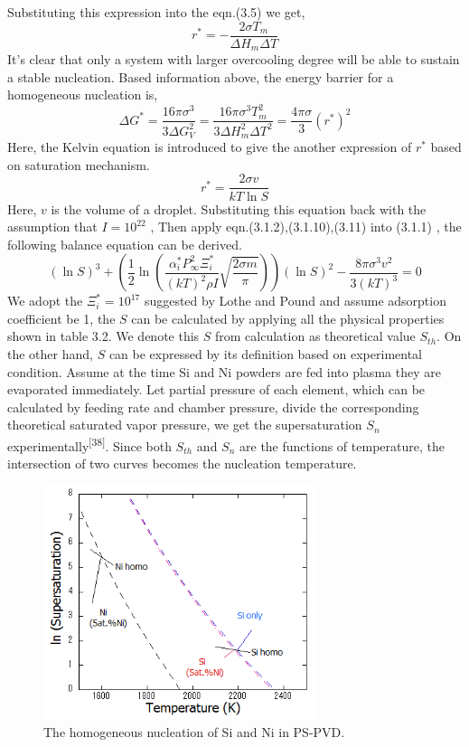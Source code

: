 Substituting this expression into the eqn.(3.5) we get,
\begin{equation}
r^{*}=-\frac{2 \sigma T_{m}}{\Delta H_{m} \Delta T}
\tag{3.1.9}
\end{equation}
It’s clear that only a system with larger overcooling degree will be able to sustain a stable nucleation. 
Based information above, the energy barrier for a homogeneous nucleation is, 
\begin{equation}
\Delta G^{*}=\frac{16 \pi \sigma^{3}}{3 \Delta G_{V}^{2}}=\frac{16 \pi \sigma^{3} T_{m}^{2}}{3 \Delta H_{m}^{2} \Delta T^{2}}=\frac{4 \pi \sigma}{3}\left(r^{*}\right)^{2}
\tag{3.1.10}
\end{equation}
Here, the Kelvin equation is introduced to give the another expression of $r^{*}$ based on saturation mechanism.
\begin{equation}
r^{*}=\frac{2 \sigma v}{k T \ln S}
\tag{3.1.11}
\end{equation}
Here, $v$ is the volume of a droplet. Substituting this equation back with the assumption that $I =10^{22}$ ,  Then apply eqn.(3.1.2),(3.1.10),(3.11) into (3.1.1) ,  the following balance equation can be derived.
\begin{equation}
(\ln S)^{3}+\left(\frac{1}{2} \ln \left(\frac{\alpha_{i}^{*} P_{\infty}^{2} \Xi_{i}^{*}}{(k T)^{2} \rho I} \sqrt{\frac{2 \sigma m}{\pi}}\right)\right)(\ln S)^{2}-\frac{8 \pi \sigma^{3} v^{2}}{3(k T)^{3}}=0
\tag{3.1.12}
\end{equation}
We adopt the  $\Xi_{i}^{*}=10^{17}$ suggested by Lothe and Pound and assume adsorption coefficient  be 1, the $S$ can be calculated by applying all the physical properties shown in table 3.2. We denote this $S$ from calculation as theoretical value $S_{th}$.
On the other hand, $S$ can be expressed by its definition based on experimental condition. Assume at the time Si and Ni powders are fed into plasma they are evaporated immediately. Let partial pressure of each element, which can be calculated by feeding rate and chamber pressure, divide the corresponding theoretical saturated vapor pressure, we get the supersaturation $S_{n}$ experimentally\textsuperscript{[38]}.
Since both $S_{th}$ and $S_{n}$ are the functions of temperature, the intersection of two curves becomes the nucleation temperature. 
\begin{figure}[H]
\centering
\includegraphics[width=8cm]{src/fig/fig32.png}
\caption{The homogeneous nucleation of Si and Ni in PS-PVD.}
\end{figure}

